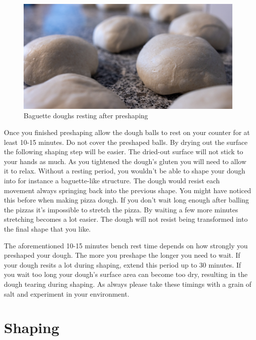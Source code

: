 \begin{figure}[!htb]
  \includegraphics[width=\textwidth]{preshaped-dough}
  \caption{Baguette doughs resting after preshaping}
  \label{fig:dough-after-preshaping}
\end{figure}

Once you finished preshaping allow the dough balls to rest
on your counter for at least 10-15 minutes. Do not
cover the preshaped balls. By drying out the surface
the following shaping step will be easier. The dried-out surface
will not stick to your hands as much. As
you tightened the dough's gluten you will need to
allow it to relax. Without a resting period, you wouldn't
be able to shape your dough into for instance a baguette-like structure.
The dough would resist each movement
always springing back into the previous shape. You
might have noticed this before when making pizza dough. If you
don't wait long enough after balling the pizzas it's impossible
to stretch the pizza. By waiting a few more minutes
stretching becomes a lot easier. The dough will not resist
being transformed into the final shape that you like.

The aforementioned 10-15 minutes bench rest time depends
on how strongly you preshaped your dough. The more
you preshape the longer you need to wait. If your dough
resits a lot during shaping, extend this period up to 30 minutes.
If you wait too long your dough's surface area can become too dry,
resulting in the dough tearing during shaping. As always please
take these timings with a grain of salt and experiment in
your environment.

\section{Shaping}

